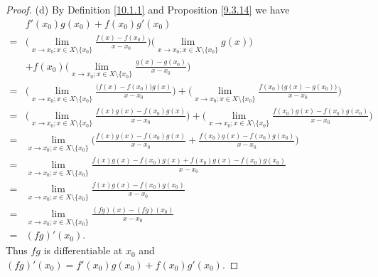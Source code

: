 \begin{proof}{(d)}
    By Definition \ref{10.1.1} and Proposition \ref{9.3.14} we have
    \begin{align*}
          & f'(x_0) g(x_0) + f(x_0) g'(x_0)                                                                                                                                                                                 \\
        = & \bigg(\lim_{x \to x_0 ; x \in X \setminus \{x_0\}} \frac{f(x) - f(x_0)}{x - x_0}\bigg) \bigg(\lim_{x \to x_0 ; x \in X \setminus \{x_0\}} g(x)\bigg)                                                            \\
          & + f(x_0) \bigg(\lim_{x \to x_0 ; x \in X \setminus \{x_0\}} \frac{g(x) - g(x_0)}{x - x_0}\bigg)                                                                                                                 \\
        = & \bigg(\lim_{x \to x_0 ; x \in X \setminus \{x_0\}} \frac{\big(f(x) - f(x_0)\big) g(x)}{x - x_0}\bigg) + \bigg(\lim_{x \to x_0 ; x \in X \setminus \{x_0\}} \frac{f(x_0) \big(g(x) - g(x_0)\big)}{x - x_0}\bigg) \\
        = & \bigg(\lim_{x \to x_0 ; x \in X \setminus \{x_0\}} \frac{f(x) g(x) - f(x_0) g(x)}{x - x_0}\bigg) + \bigg(\lim_{x \to x_0 ; x \in X \setminus \{x_0\}} \frac{f(x_0) g(x) - f(x_0) g(x_0)}{x - x_0}\bigg)         \\
        = & \lim_{x \to x_0 ; x \in X \setminus \{x_0\}} \bigg(\frac{f(x) g(x) - f(x_0) g(x)}{x - x_0} + \frac{f(x_0) g(x) - f(x_0) g(x_0)}{x - x_0}\bigg)                                                                  \\
        = & \lim_{x \to x_0 ; x \in X \setminus \{x_0\}} \frac{f(x) g(x) - f(x_0) g(x) + f(x_0) g(x) - f(x_0) g(x_0)}{x - x_0}                                                                                              \\
        = & \lim_{x \to x_0 ; x \in X \setminus \{x_0\}} \frac{f(x) g(x) - f(x_0) g(x_0)}{x - x_0}                                                                                                                          \\
        = & \lim_{x \to x_0 ; x \in X \setminus \{x_0\}} \frac{(fg)(x) - (fg)(x_0)}{x - x_0}                                                                                                                                \\
        = & (fg)'(x_0).
    \end{align*}
    Thus \(fg\) is differentiable at \(x_0\) and \((fg)'(x_0) = f'(x_0) g(x_0) + f(x_0) g'(x_0)\).
\end{proof}

